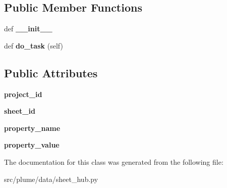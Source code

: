 \subsection*{Public Member Functions}
\begin{DoxyCompactItemize}
\item 
def {\bfseries \+\_\+\+\_\+init\+\_\+\+\_\+}\hypertarget{classplume-creator_1_1src_1_1plume_1_1data_1_1sheet__hub_1_1_set_property_a1ca117789bf2dcc2a9933419f637a720}{}\label{classplume-creator_1_1src_1_1plume_1_1data_1_1sheet__hub_1_1_set_property_a1ca117789bf2dcc2a9933419f637a720}

\item 
def {\bfseries do\+\_\+task} (self)\hypertarget{classplume-creator_1_1src_1_1plume_1_1data_1_1sheet__hub_1_1_set_property_ab6d6ed1decefda2f5d43496186583ce2}{}\label{classplume-creator_1_1src_1_1plume_1_1data_1_1sheet__hub_1_1_set_property_ab6d6ed1decefda2f5d43496186583ce2}

\end{DoxyCompactItemize}
\subsection*{Public Attributes}
\begin{DoxyCompactItemize}
\item 
{\bfseries project\+\_\+id}\hypertarget{classplume-creator_1_1src_1_1plume_1_1data_1_1sheet__hub_1_1_set_property_ad4e9963ce8051d1a646242e83d65373d}{}\label{classplume-creator_1_1src_1_1plume_1_1data_1_1sheet__hub_1_1_set_property_ad4e9963ce8051d1a646242e83d65373d}

\item 
{\bfseries sheet\+\_\+id}\hypertarget{classplume-creator_1_1src_1_1plume_1_1data_1_1sheet__hub_1_1_set_property_a202d6951bdf335de3f966951c8e765bc}{}\label{classplume-creator_1_1src_1_1plume_1_1data_1_1sheet__hub_1_1_set_property_a202d6951bdf335de3f966951c8e765bc}

\item 
{\bfseries property\+\_\+name}\hypertarget{classplume-creator_1_1src_1_1plume_1_1data_1_1sheet__hub_1_1_set_property_ac24e46751224172514715d04d605a5ba}{}\label{classplume-creator_1_1src_1_1plume_1_1data_1_1sheet__hub_1_1_set_property_ac24e46751224172514715d04d605a5ba}

\item 
{\bfseries property\+\_\+value}\hypertarget{classplume-creator_1_1src_1_1plume_1_1data_1_1sheet__hub_1_1_set_property_ad4a1b7a380f8f2d1af52ccde52789de0}{}\label{classplume-creator_1_1src_1_1plume_1_1data_1_1sheet__hub_1_1_set_property_ad4a1b7a380f8f2d1af52ccde52789de0}

\end{DoxyCompactItemize}


The documentation for this class was generated from the following file\+:\begin{DoxyCompactItemize}
\item 
src/plume/data/sheet\+\_\+hub.\+py\end{DoxyCompactItemize}
